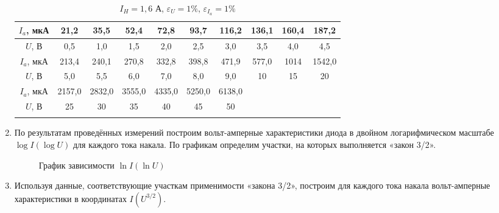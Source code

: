 \documentclass[a4paper, 12pt]{article}%
\begin{document}
\begin{enumerate}
	
	\begin{longtable} {|c|c|c|c|c|c|c|c|c|c|}
		\hline
		$I_a$, мкА & 21,2 & 35,5 & 52,4 & 72,8 & 93,7 & 116,2 & 136,1 & 160,4 & 187,2\\ \hline
		$U$, В & 0,5 & 1,0 & 1,5 & 2,0 & 2,5 & 3,0 & 3,5  & 4,0 & 4,5\\ \hline
		\hline
		$I_a$, мкА & 213,4 & 240,1 & 270,8 & 332,8 & 398,8 & 471,9 & 577,0 & 1014 & 1542,0 \\ \hline
		$U$, В & 5,0 & 5,5 & 6,0 & 7,0 & 8,0 & 9,0 & 10 & 15 & 20\\ \hline
		\hline
		$I_a$, мкА & 2157,0 & 2832,0 & 3555,0 & 4335,0 & 5250,0 & 6138,0 & & &\\ \hline
		$U$, В & 25 & 30 & 35 & 40 & 45 & 50 & & &\\ \hline
		\caption{$I_H = 1,6$ А, $\varepsilon_U = 1\%$, $\varepsilon_{I_a} = 1\%$}
	\end{longtable}
	
	
	\newpage
	
	\item По результатам проведённых измерений построим вольт-амперные характеристики диода в двойном логарифмическом масштабе
	$\log I(\log U)$ для каждого тока накала. По графикам определим участки, на которых выполняется «закон 3/2».
	
	
	\begin{figure}[H]
		\caption{График зависимости $\ln I (\ln U)$}
	\end{figure}


	\newpage
	\item Используя данные, соответствующие участкам применимости «закона 3/2», построим для каждого тока накала вольт-амперные характеристики в координатах $I(U^{3/2})$.
	

\end{enumerate}
\end{document}
